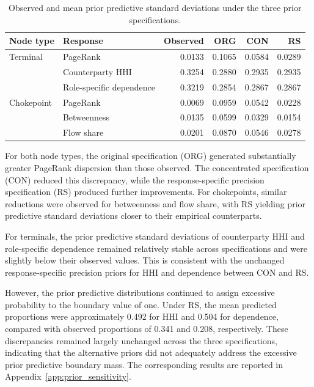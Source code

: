 \documentclass[pdftex,12pt,openright,a4paper,oneside]{book}
\begin{document}
\begin{table}[htbp]
\centering
\caption{Observed and mean prior predictive standard
deviations under the three prior specifications.}
\label{tab:prior_predictive_comparison}
\begin{tabular}{llrrrr}
\toprule
Node type & Response & Observed & ORG & CON & RS \\
\midrule
Terminal
    & PageRank & 0.0133 & 0.1065 & 0.0584 & 0.0289 \\
    & Counterparty HHI & 0.3254 & 0.2880 & 0.2935 & 0.2935 \\
    & Role-specific dependence & 0.3219 & 0.2854 & 0.2867 & 0.2867 \\
\midrule
Chokepoint
    & PageRank & 0.0069 & 0.0959 & 0.0542 & 0.0228 \\
    & Betweenness & 0.0135 & 0.0599 & 0.0329 & 0.0154 \\
    & Flow share & 0.0201 & 0.0870 & 0.0546 & 0.0278 \\
\bottomrule
\end{tabular}
\end{table}

For both node types, the original specification (ORG) generated substantially greater PageRank dispersion than those observed. 
The concentrated specification (CON) reduced this discrepancy, while the response-specific precision specification (RS) produced further improvements. 
For chokepoints, similar reductions were observed for betweenness and flow share, with RS yielding prior predictive standard deviations closer to their empirical counterparts.

For terminals, the prior predictive standard deviations of counterparty HHI and role-specific dependence remained relatively stable across specifications and were slightly below their observed values. 
This is consistent with the unchanged response-specific precision priors for HHI and dependence between CON and RS.

However, the prior predictive distributions continued to assign excessive probability to the boundary value of one. Under RS, the mean predicted proportions were approximately 0.492 for HHI and 0.504 for dependence, compared with observed proportions of 0.341 and 0.208, respectively. 
These discrepancies remained largely unchanged across the three specifications, indicating that the alternative priors did not adequately address the excessive prior predictive boundary mass. 
The corresponding results are reported in Appendix~\ref{app:prior_sensitivity}.
\end{document}
